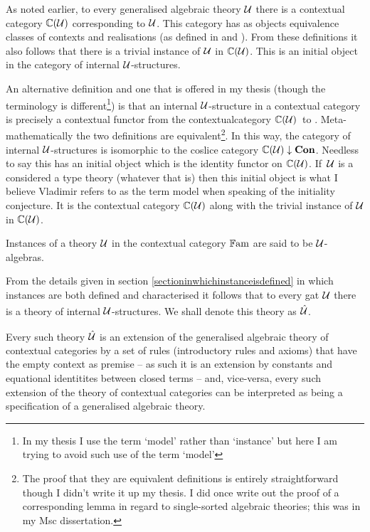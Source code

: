 \note 
As  noted earlier, to every generalised algebraic theory $\gat[U]$ there  is a contextual category $\CofU$ corresponding to $\gat[U]$. This category has as objects equivalence classes of contexts and realisations (as defined 
in \cite{Cartmell78} and  \cite{Cartmell86}). 
From these definitions it also follows that there is a trivial instance
of $\gat[U]$ in  $\CofU$. This is an initial object in
the category of internal $\gat[U]$-structures.

\note 
An alternative definition and one that is offered  in my thesis 
(though the terminology is different\footnote{In my thesis I use the term `model' rather than `instance'  but here I am trying to avoid such use of the term `model'}) is that an internal $\gat[U]$-structure in a contextual category \catcw is precisely 
a contextual functor from the contextualcategory $\CofU$\  to \catc. 
Meta-mathematically the two definitions are equivalent\footnote{The proof that they are equivalent 
definitions is entirely straightforward though I didn't write it up my thesis. I did once write out the proof of a  corresponding lemma in regard to single-sorted algebraic theories; this was in my Msc dissertation.}.
\note
In this way, the category of internal $\gat[U]$-structures  is isomorphic to the coslice category
$\CofU \downarrow \catCon$. Needless to say this has an initial object which is the identity functor on  $\CofU$.
If\ $\gat[U]$ is a considered a type theory (whatever that is) then this initial object is what I believe Vladimir refers
to as the term model when speaking of the initiality conjecture. It is the contextual category
$\CofU$ along with the trivial instance of $\gat[U]$ in $\CofU$.

\note 
Instances of a theory $\gat[U]$ in the contextual category $\Fam$ are said to be $\gat[U]$-algebras. 

\note 
From the details given in
section \ref{sectioninwhichinstanceisdefined} 
in which instances are both defined and characterised 
it follows that 
to every gat $\gat[U]$ there is a theory of internal $\gat[U]$-structures. We shall denote this theory as $\hatU$.

Every such theory $\hatU$ is an extension of the generalised algebraic theory of contextual categories
by a set of rules (introductory rules and axioms) that have  the empty context as premise -- as such it is an extension
by constants and equational identitites between closed terms -- and, vice-versa, every such extension of
the theory of contextual categories can be interpreted as being a specification of a generalised algebraic theory.  

